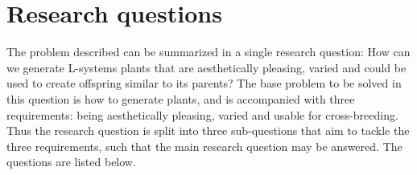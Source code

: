 

\section{Research questions}
The problem described can be summarized in a single research question: How can we generate \glspl{L-system} plants that are aesthetically pleasing, varied and could be used to create offspring similar to its parents?
The base problem to be solved in this question is how to generate plants, and is accompanied with three requirements: being aesthetically pleasing, varied and usable for cross-breeding.
Thus the research question is split into three sub-questions that aim to tackle the three requirements, such that the main research question may be answered.
The questions are listed below.


